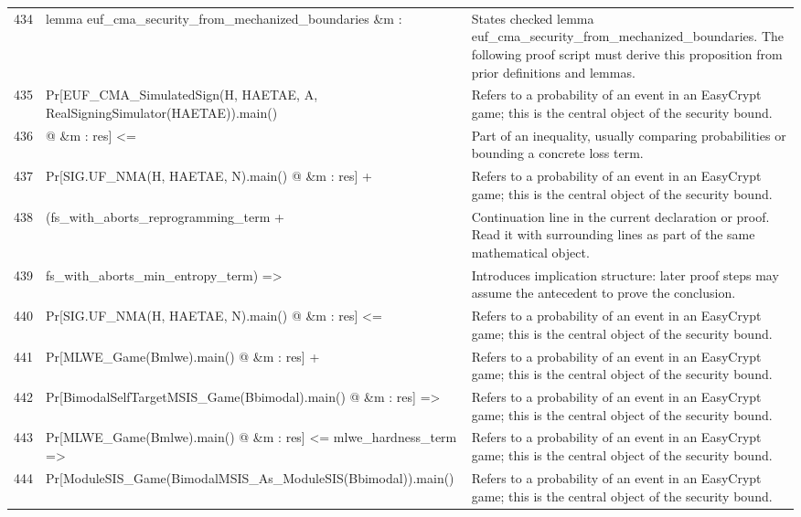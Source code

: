\documentclass[10pt]{article}
\begin{document}
\begin{longtable}{r L{0.53\textwidth} L{0.37\textwidth}}
434 & {\ttfamily\scriptsize lemma euf\_cma\_security\_from\_mechanized\_boundaries \&m :} & States checked lemma euf\_cma\_security\_from\_mechanized\_boundaries.  The following proof script must derive this proposition from prior definitions and lemmas. \\
435 & {\ttfamily\scriptsize   Pr[EUF\_CMA\_SimulatedSign(H, HAETAE, A, RealSigningSimulator(HAETAE)).main()} & Refers to a probability of an event in an EasyCrypt game; this is the central object of the security bound. \\
436 & {\ttfamily\scriptsize        @ \&m : res] <=} & Part of an inequality, usually comparing probabilities or bounding a concrete loss term. \\
437 & {\ttfamily\scriptsize     Pr[SIG.UF\_NMA(H, HAETAE, N).main() @ \&m : res] +} & Refers to a probability of an event in an EasyCrypt game; this is the central object of the security bound. \\
438 & {\ttfamily\scriptsize     (fs\_with\_aborts\_reprogramming\_term +} & Continuation line in the current declaration or proof.  Read it with surrounding lines as part of the same mathematical object. \\
439 & {\ttfamily\scriptsize       fs\_with\_aborts\_min\_entropy\_term) =>} & Introduces implication structure: later proof steps may assume the antecedent to prove the conclusion. \\
440 & {\ttfamily\scriptsize   Pr[SIG.UF\_NMA(H, HAETAE, N).main() @ \&m : res] <=} & Refers to a probability of an event in an EasyCrypt game; this is the central object of the security bound. \\
441 & {\ttfamily\scriptsize     Pr[MLWE\_Game(Bmlwe).main() @ \&m : res] +} & Refers to a probability of an event in an EasyCrypt game; this is the central object of the security bound. \\
442 & {\ttfamily\scriptsize     Pr[BimodalSelfTargetMSIS\_Game(Bbimodal).main() @ \&m : res] =>} & Refers to a probability of an event in an EasyCrypt game; this is the central object of the security bound. \\
443 & {\ttfamily\scriptsize   Pr[MLWE\_Game(Bmlwe).main() @ \&m : res] <= mlwe\_hardness\_term =>} & Refers to a probability of an event in an EasyCrypt game; this is the central object of the security bound. \\
444 & {\ttfamily\scriptsize   Pr[ModuleSIS\_Game(BimodalMSIS\_As\_ModuleSIS(Bbimodal)).main()} & Refers to a probability of an event in an EasyCrypt game; this is the central object of the security bound. \\

\end{longtable}
\end{document}
